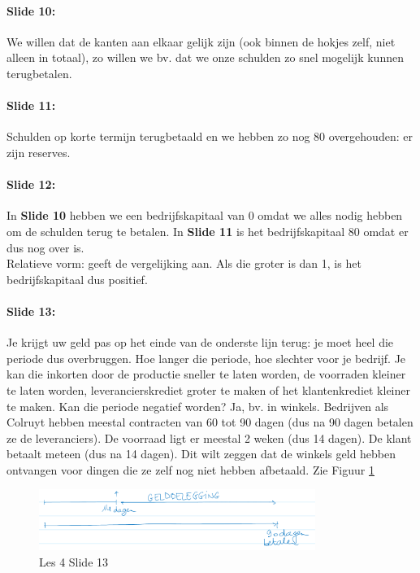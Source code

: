 \documentclass[10pt,a4paper]{report}
\begin{document}
\paragraph{Slide 10:} We willen dat de kanten aan elkaar gelijk zijn (ook binnen de hokjes zelf, niet alleen in totaal), zo willen we bv. dat we onze schulden zo snel mogelijk kunnen terugbetalen. 

\paragraph{Slide 11:} Schulden op korte termijn terugbetaald en we hebben zo nog 80 overgehouden: er zijn reserves.

\paragraph{Slide 12:} In \textbf{Slide 10} hebben we een bedrijfskapitaal van 0 omdat we alles nodig hebben om de schulden terug te betalen. In \textbf{Slide 11} is het bedrijfskapitaal 80 omdat er dus nog over is.\\
Relatieve vorm: geeft de vergelijking aan. Als die groter is dan 1, is het bedrijfskapitaal dus positief.\\

\paragraph{Slide 13:} Je krijgt uw geld pas op het einde van de onderste lijn terug: je moet heel die periode dus overbruggen. Hoe langer die periode, hoe slechter voor je bedrijf. Je kan die inkorten door de productie sneller te laten worden, de voorraden kleiner te laten worden, leverancierskrediet groter te maken of het klantenkrediet kleiner te maken. Kan die periode negatief worden? Ja, bv. in winkels. Bedrijven als Colruyt hebben meestal contracten van 60 tot 90 dagen (dus na 90 dagen betalen ze de leveranciers). De voorraad ligt er meestal 2 weken (dus 14 dagen). De klant betaalt meteen (dus na 14 dagen). Dit wilt zeggen dat de winkels geld hebben ontvangen voor dingen die ze zelf nog niet hebben afbetaald. Zie Figuur \ref{les04_01}

\begin{figure}[h!]
\centering
\includegraphics[width=90mm]{Les04_01.png}
\caption{Les 4 Slide 13} 
\label{les04_01}
\end{figure}
\end{document}
